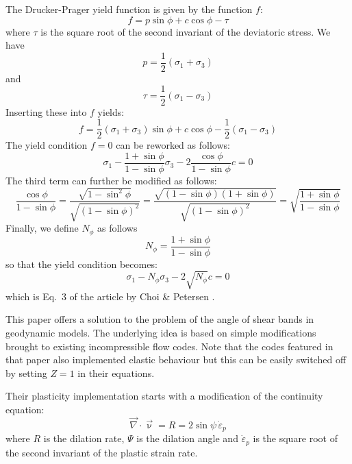 The Drucker-Prager yield function is given by the function $f$:
\[
f = p \sin\phi + c\cos \phi - \tau
\]
where $\tau$ is the square root of the second invariant of the deviatoric stress.
We have
\[
p=\frac{1}{2}(\sigma_1+\sigma_3) 
\]
and 
\[
\tau = \frac{1}{2}(\sigma_1-\sigma_3)
\]
Inserting these into $f$ yields:
\[
f= \frac{1}{2}(\sigma_1+\sigma_3) \sin\phi + c \cos\phi - \frac{1}{2}(\sigma_1-\sigma_3)
\]
The yield condition $f=0$ can be reworked as follows:
\[
\sigma_1 - \frac{1 + \sin\phi}{1-\sin\phi} \sigma_3 - 2 \frac{\cos \phi}{1-\sin\phi} c = 0
\]
The third term can further be modified as follows:
\[
\frac{\cos \phi}{1-\sin\phi}
=\frac{\sqrt{1-\sin^2 \phi}}{\sqrt{(1-\sin\phi)^2}}
=\frac{\sqrt{(1-\sin \phi)(1+\sin\phi)}}{\sqrt{(1-\sin\phi)^2}}
=\sqrt{
\frac{1+\sin\phi}{1-\sin\phi}
}
\]
Finally, we define $N_\phi$ as follows 
\[
N_\phi=\frac{1+\sin \phi}{1-\sin\phi}
\]
so that the yield condition becomes:
\[
\sigma_1 - N_\phi \sigma_3 - 2 \sqrt{N_\phi} c = 0
\]
which is Eq.~3 of the article by Choi \& Petersen \cite{chpe15}.

This paper offers a solution to the problem of the angle of shear bands in 
geodynamic models. The underlying idea is based on simple modifications 
brought to existing incompressible flow codes. Note that the codes
featured in that paper also implemented elastic behaviour but this can 
be easily switched off by setting $Z=1$ in their equations.

Their plasticity implementation starts with a modification of the 
continuity equation:
\[
\vec\nabla\cdot\vec\upnu = R = 2 \sin\psi \, \dot{\varepsilon}_p
\]
where $R$ is the dilation rate, $\Psi$ is the dilation angle 
and $\dot{\varepsilon}_p$ is the square root of 
the second invariant of the plastic strain rate.

